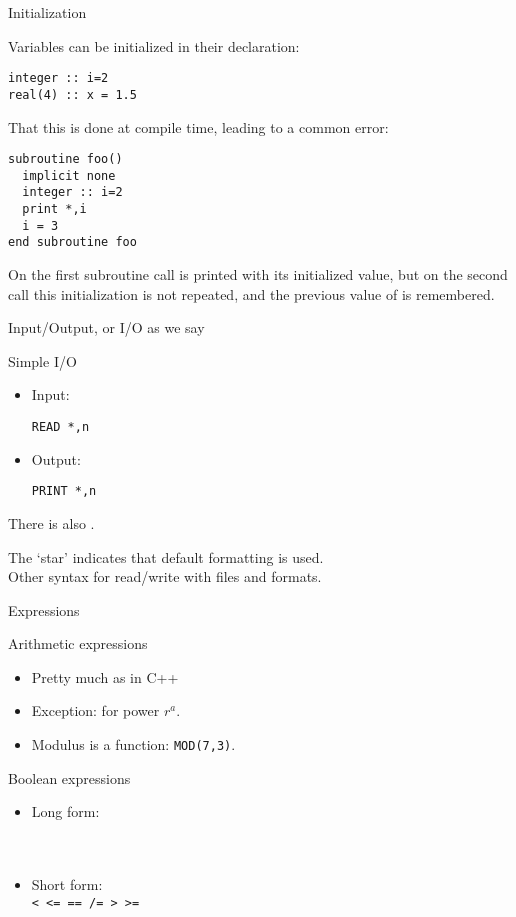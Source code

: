  {Initialization}

Variables can be initialized in their declaration:
\begin{lstlisting}
integer :: i=2
real(4) :: x = 1.5
\end{lstlisting}

That this is done at compile time, leading to a common error:
\begin{lstlisting}
subroutine foo()
  implicit none
  integer :: i=2
  print *,i
  i = 3
end subroutine foo
\end{lstlisting}
On the first subroutine call  is printed with its initialized
value, but on the second call this initialization is not repeated, and
the previous value of  is remembered.

 {Input/Output, or I/O as we say}
\label{sec:fio}

\begin{block}{Simple I/O}
  \label{sl:frw}
  \begin{itemize}
  \item Input: 
\begin{lstlisting}
READ *,n
\end{lstlisting}
\item Output:
\begin{lstlisting}
PRINT *,n
\end{lstlisting}
  \end{itemize}
  There is also .

  The `star' indicates that default formatting is used.\\
  Other syntax for read/write with files and formats.
\end{block}

 {Expressions}
\label{sec:fexpr}

\begin{block}{Arithmetic expressions}
  \label{sl:farith}
  \begin{itemize}
  \item Pretty much as in C++
  \item Exception:  for power $r^a$.
  \item Modulus is a function: \lstinline{MOD(7,3)}.
  \end{itemize}
\end{block}

\begin{block}{Boolean expressions}
  \label{sl:fbool}
  \begin{itemize}
  \item 
    Long form:\\
    \\
    \\
  \item Short form:\\
    \verb+< <= == /= > >=+
  \end{itemize}
\end{block}

